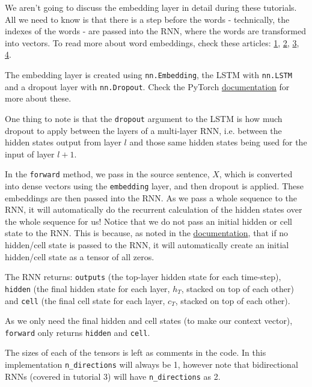 \documentclass[11pt]{article}
\begin{document}
We aren't going to discuss the embedding layer in detail during these
tutorials. All we need to know is that there is a step before the words
- technically, the indexes of the words - are passed into the RNN, where
the words are transformed into vectors. To read more about word
embeddings, check these articles:
\href{https://monkeylearn.com/blog/word-embeddings-transform-text-numbers/}{1},
\href{http://p.migdal.pl/2017/01/06/king-man-woman-queen-why.html}{2},
\href{http://mccormickml.com/2016/04/19/word2vec-tutorial-the-skip-gram-model/}{3},
\href{http://mccormickml.com/2017/01/11/word2vec-tutorial-part-2-negative-sampling/}{4}.

The embedding layer is created using \texttt{nn.Embedding}, the LSTM
with \texttt{nn.LSTM} and a dropout layer with \texttt{nn.Dropout}.
Check the PyTorch
\href{https://pytorch.org/docs/stable/nn.html}{documentation} for more
about these.

One thing to note is that the \texttt{dropout} argument to the LSTM is
how much dropout to apply between the layers of a multi-layer RNN, i.e.
between the hidden states output from layer \(l\) and those same hidden
states being used for the input of layer \(l+1\).

In the \texttt{forward} method, we pass in the source sentence, \(X\),
which is converted into dense vectors using the \texttt{embedding}
layer, and then dropout is applied. These embeddings are then passed
into the RNN. As we pass a whole sequence to the RNN, it will
automatically do the recurrent calculation of the hidden states over the
whole sequence for us! Notice that we do not pass an initial hidden or
cell state to the RNN. This is because, as noted in the
\href{https://pytorch.org/docs/stable/nn.html\#torch.nn.LSTM}{documentation},
that if no hidden/cell state is passed to the RNN, it will automatically
create an initial hidden/cell state as a tensor of all zeros.

The RNN returns: \texttt{outputs} (the top-layer hidden state for each
time-step), \texttt{hidden} (the final hidden state for each layer,
\(h_T\), stacked on top of each other) and \texttt{cell} (the final cell
state for each layer, \(c_T\), stacked on top of each other).

As we only need the final hidden and cell states (to make our context
vector), \texttt{forward} only returns \texttt{hidden} and
\texttt{cell}.

The sizes of each of the tensors is left as comments in the code. In
this implementation \texttt{n\_directions} will always be 1, however
note that bidirectional RNNs (covered in tutorial 3) will have
\texttt{n\_directions} as 2.
\end{document}
